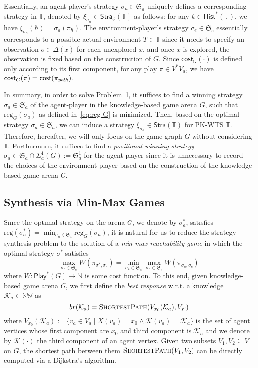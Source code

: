 \documentclass{ifacconf}
\def \K{\mathcal{K}}
\def \NN{\mathbb{N}}
\def \stra{\textsf{Stra}}
\def \reg{\text{reg}}
\def \hist{\textsf{Hist}}
\def \cost{\textsf{cost}}
\def \S{\mathfrak{S}}
\def \T{\mathbb{T}}
\begin{document}
Essentially,  an agent-player's strategy $\sigma_a\in \S_a$ uniquely defines a corresponding strategy  in $\T$, denoted by $\xi_{\sigma_a}\in \stra_\phi(\T)$ as follows:  
for any $\hbar\in \hist^*(\T)$, we have $ \xi_{\sigma_a}(\hbar)=\sigma_a(\pi_\hbar)$. The environment-player's strategy  $\sigma_e\in \S_e$ essentially corresponds to a possible actual environment $T\in \T$ since it needs to specify an observation $o\in \Delta(x)$ for each unexplored $x$, and once $x$ is explored, the observation is fixed based on the construction of $G$.  Since $\cost_G(\cdot)$ is defined only according to its first component, for any play $\pi\in V^*V_a$, we have 
$\cost_G(\pi) =  \cost( \pi_{\text{\emph{path}}} )$.

In summary,   in order to solve Problem~1, it suffices to find a winning strategy $\sigma_a\!\in\! \S_a$ of the agent-player in the knowledge-based game arena $G$, such that 
$\reg_G(\sigma_a)$ as defined in~\eqref{eq:reg-G} is minimized. 
Then, based on the optimal strategy $\sigma_a\!\in\! \S_a$, we can induce a strategy $\xi_{\sigma_a}\!\in\! \stra(\T)$ for PK-WTS $\T$. Therefore, hereafter, we will only focus on the game graph $G$ without considering $\T$. 
Furthermore, it suffices to find a \emph{positional winning strategy} $\sigma_a\!\in\!\S_a\cap\Sigma_a^1(G)\!:=\!\S_a^1$ for the agent-player since it is unnecessary to record the choices of the environment-player based on the construction of the knowledge-based game arena $G$.

\subsection{Synthesis via Min-Max Games}
Since the optimal strategy on the arena $G$, we denote by $\sigma_a^*$, satisfies $\reg(\sigma_a^*)=\min_{\sigma_a\in\S_a}\reg_G(\sigma_a)$, it is natural for us to reduce the strategy synthesis problem to the solution of a \emph{min-max reachability game} \citet{brihaye2017pseudopolynomial} in which the optimal strategy $\sigma^*$ satisfies 
\begin{equation}
    \max_{\sigma_e\in\S_e}W(\pi_{\sigma^*,\sigma_e})=\min_{\sigma_a\in\S_a}\max_{\sigma_e\in\S_e}W(\pi_{\sigma_a,\sigma_e})
\end{equation}
where $W\!:\!\textsf{Play}^*(G)\!\to\! \NN$ is some cost function.
To this end, given knowledge-based game arena $G$, we first define the \emph{best response} w.r.t. a knowledge $\K_a\!\in\!\mathbb{KW}$ as 
\begin{equation}
    br(\K_a)=\textsc{ShortestPath}(V_{x_0}(\K_a),V_F)
\end{equation}
where $V_{x_0}(\K_a)\!:=\!\{v_a\!\in\! V_a\mid X(v_a)\!=\!x_0\wedge \K(v_a)\!=\!\K_a\}$ is the set of agent vertices whose first component are $x_0$ and third component is $\K_a$ and we denote by $\K(\cdot)$ the third component of an agent vertex. Given two subsets $V_1,V_2\subseteq V$ on $G$, the shortest path between them $\textsc{ShortestPath}(V_1,V_2)$ can be directly computed via a Dijkstra’s algorithm.
\end{document}
